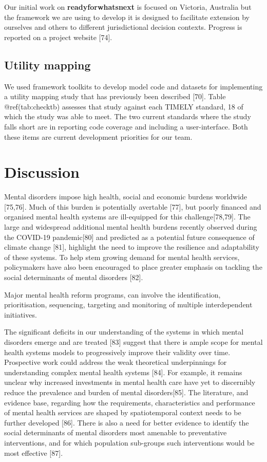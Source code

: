 \documentclass[
]{article}
\begin{document}
Our initial work on \textbf{readyforwhatsnext} is focused on Victoria, Australia but the framework we are using to develop it is designed to facilitate extension by ourselves and others to different jurisdictional decision contexts. Progress is reported on a project website {[}74{]}.

\hypertarget{utility-mapping}{%
\subsection{Utility mapping}\label{utility-mapping}}

We used framework toolkits to develop model code and datasets for implementing a utility mapping study that has previously been described {[}70{]}. Table @ref(tab:checktb) assesses that study against each TIMELY standard, 18 of which the study was able to meet. The two current standards where the study falls short are in reporting code coverage and including a user-interface. Both these items are current development priorities for our team.

\hypertarget{discussion}{%
\section{Discussion}\label{discussion}}

Mental disorders impose high health, social and economic burdens worldwide {[}75,76{]}. Much of this burden is potentially avertable {[}77{]}, but poorly financed and organised mental health systems are ill-equipped for this challenge{[}78,79{]}. The large and widespread additional mental health burdens recently observed during the COVID-19 pandemic{[}80{]} and predicted as a potential future consequence of climate change {[}81{]}, highlight the need to improve the resilience and adaptability of these systems. To help stem growing demand for mental health services, policymakers have also been encouraged to place greater emphasis on tackling the social determinants of mental disorders {[}82{]}.

Major mental health reform programs, can involve the identification, prioritisation, sequencing, targeting and monitoring of multiple interdependent initiatives.

The significant deficits in our understanding of the systems in which mental disorders emerge and are treated {[}83{]} suggest that there is ample scope for mental health systems models to progressively improve their validity over time. Prospective work could address the weak theoretical underpinnings for understanding complex mental health systems {[}84{]}. For example, it remains unclear why increased investments in mental health care have yet to discernibly reduce the prevalence and burden of mental disorders{[}85{]}. The literature, and evidence base, regarding how the requirements, characteristics and performance of mental health services are shaped by spatiotemporal context needs to be further developed {[}86{]}. There is also a need for better evidence to identify the social determinants of mental disorders most amenable to preventative interventions, and for which population sub-groups such interventions would be most effective {[}87{]}.
\end{document}
